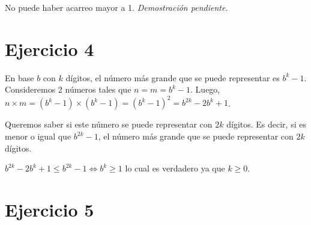 No puede haber acarreo mayor a 1. \emph{Demostración pendiente.}

\section{Ejercicio 4}

En base $b$ con $k$ dígitos, el número más grande que se puede representar es $b^k - 1$. Consideremos 2 números tales que $n = m = b^k - 1$. Luego, $n \times m = (b^k - 1) \times (b^k - 1) = (b^k - 1)^2 = b^{2k} - 2b^k + 1$.

Queremos saber si este número se puede representar con $2k$ dígitos. Es decir, si es menor o igual que $b^{2k} - 1$, el número más grande que se puede representar con $2k$ dígitos.

$b^{2k} - 2b^k + 1 \leq b^{2k} - 1 \iff b^k \geq 1$ lo cual es verdadero ya que $k \geq 0$.

\section{Ejercicio 5}


